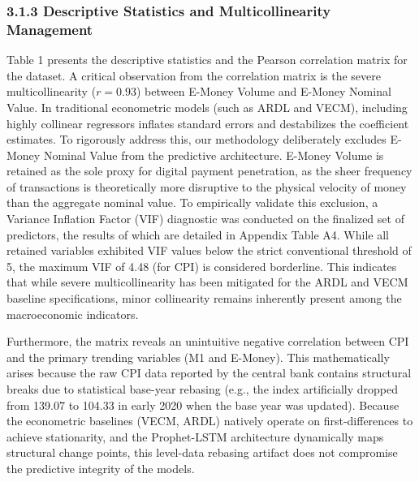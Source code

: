 \documentclass[12pt, letterpaper]{article}
\begin{document}
\subsubsection*{3.1.3 Descriptive Statistics and Multicollinearity Management}
Table 1 presents the descriptive statistics and the Pearson correlation matrix for the dataset. A critical observation from the correlation matrix is the severe multicollinearity ($r = 0.93$) between E-Money Volume and E-Money Nominal Value. In traditional econometric models (such as ARDL and VECM), including highly collinear regressors inflates standard errors and destabilizes the coefficient estimates. To rigorously address this, our methodology deliberately excludes E-Money Nominal Value from the predictive architecture. E-Money Volume is retained as the sole proxy for digital payment penetration, as the sheer frequency of transactions is theoretically more disruptive to the physical velocity of money than the aggregate nominal value. To empirically validate this exclusion, a Variance Inflation Factor (VIF) diagnostic was conducted on the finalized set of predictors, the results of which are detailed in Appendix Table A4. While all retained variables exhibited VIF values below the strict conventional threshold of 5, the maximum VIF of 4.48 (for CPI) is considered borderline. This indicates that while severe multicollinearity has been mitigated for the ARDL and VECM baseline specifications, minor collinearity remains inherently present among the macroeconomic indicators.

Furthermore, the matrix reveals an unintuitive negative correlation between CPI and the primary trending variables (M1 and E-Money). This mathematically arises because the raw CPI data reported by the central bank contains structural breaks due to statistical base-year rebasing (e.g., the index artificially dropped from 139.07 to 104.33 in early 2020 when the base year was updated). Because the econometric baselines (VECM, ARDL) natively operate on first-differences to achieve stationarity, and the Prophet-LSTM architecture dynamically maps structural change points, this level-data rebasing artifact does not compromise the predictive integrity of the models.
\end{document}
